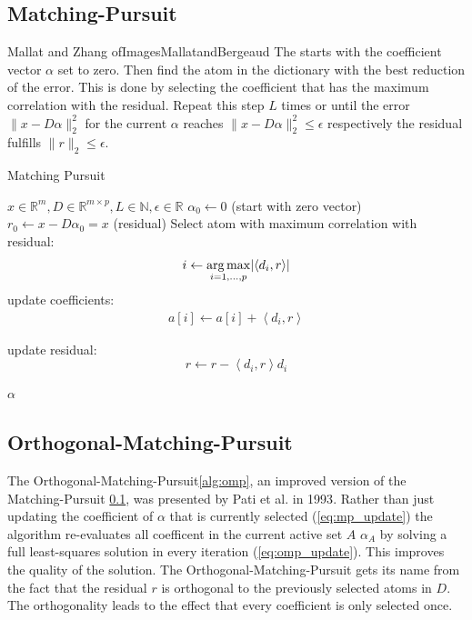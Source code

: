 \subsection{Matching-Pursuit}
\label{sec:mp}
Mallat and Zhang\cite{Mallat1993}
ofImagesMallatandBergeaud \cite{Mallat1995}
The  starts with the coefficient vector $\alpha$ set to
zero. Then find the atom in the dictionary with the best reduction of the
error. This is done by selecting the coefficient that has the maximum
correlation with the residual. Repeat this step $L$ times or until the error
$\lVert x - D\alpha \rVert^{2}_{2}$ for the current $\alpha$ reaches $\lVert x -
D\alpha \rVert^{2}_{2} \leq \epsilon$ respectively the residual fulfills
$\lVert
r \rVert_2 \leq \epsilon$.


\begin{algorithm}
\caption{Matching Pursuit}
\label{alg:mp}
\begin{algorithmic}[1]
\REQUIRE $x \in \mathbb{R}^m, D \in \mathbb{R}^{m\times p}, L \in \mathbb{N}, \epsilon \in \mathbb{R}$
\STATE $\alpha_0 \gets 0$ (start with zero vector)
\STATE $r_0 \gets x-D\alpha_0 = x$ (residual) 
\STATE Select atom with maximum correlation with residual: 
\begin{equation*}
i \gets \operatorname*{arg\,max}_{i=1,...,p} \lvert \left<d_i,r\right> \rvert
\end{equation*}
\STATE update coefficients: 
\begin{align}
a[i]  \gets a[i] + \left<d_i,r\right> \label{eq:mp_update}
\end{align}

\STATE update residual:
\begin{equation*}
 r \gets r - \left<d_i,r\right>d_i
\end{equation*}

\ENDWHILE
\RETURN $\alpha$
\end{algorithmic}
\end{algorithm}
\subsection{Orthogonal-Matching-Pursuit}
\label{sec:omp}

The Orthogonal-Matching-Pursuit\ref{alg:omp}, an improved version of
the Matching-Pursuit \ref{sec:mp}, was presented by Pati et al.
in 1993\cite{Pati1993}. Rather than just updating the coefficient of $\alpha$
that is currently selected (\ref{eq:mp_update}) the algorithm re-evaluates
all coefficent in the current active set $A$ 
$\alpha_A$ by solving a full least-squares solution in every iteration
(\ref{eq:omp_update}). This improves the quality of the
solution.\cite{Pati1993} The Orthogonal-Matching-Pursuit gets its name from
the fact that the residual $r$ is orthogonal to the previously selected atoms in
$D$. The orthogonality leads to the effect that every coefficient is only
selected
once.


